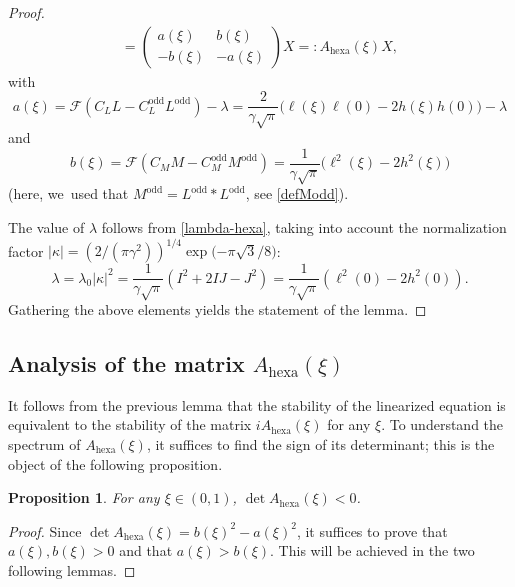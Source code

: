 \documentclass[10pt]{amsart}
\newtheorem{prop}[theorem]{Proposition}
\theoremstyle{definition}
\let\EE\exp
\newcommand{\pa}[1]{\left(#1\right)}
\begin{document}
\begin{proof}
\begin{multline}
=\begin{pmatrix} a(\xi) & b(\xi) \\[2pt] -b(\xi) & -a(\xi) \end{pmatrix}X
=:A_{\mathrm{hexa}}(\xi)X,
\end{multline}
with
\begin{equation}\label{def_a_hexa}
a(\xi) = \mathcal{F} \pa{C_L L- C_L^{\text{odd}}L^{\text{odd}}} -\lambda
= \frac{2}{\gamma\sqrt{\pi}}\bigl(\ell(\xi)\ell(0)-2h(\xi)h(0)\bigr) -\lambda
\end{equation}
and
\begin{equation}\label{def_b_hexa}
b(\xi) = \mathcal{F} \pa{C_M M- C_M^{\text{odd}}M^{\text{odd}}}
= \frac{1}{\gamma\sqrt{\pi}}\bigl({\ell^2(\xi)-2h^2(\xi)}\bigr)
\end{equation}
(here, we~used that $M^{\text{odd}} = L^{\text{odd}} * L^{\text{odd}}$, see \eqref{defModd}).

The value of $\lambda$ follows from \eqref{lambda-hexa}, taking into account the normalization factor $|\kappa|= \pa{2/{(\pi\gamma^2)}}^{1/4} \EE\bigl({-{\pi \sqrt{3}}/{8}}\bigr)$:
\begin{equation}\label{def_lambda_hexa}
\lambda = \lambda_0 |\kappa|^2=\frac{1}{\gamma\sqrt{\pi}}\pa{I^2+2IJ-J^2}=\frac{1}{\gamma\sqrt{\pi}}\pa{\ell^2(0)-2h^2(0)}.
\end{equation}
Gathering the above elements yields the statement of the lemma. \end{proof}

\subsection{Analysis of the matrix $A_{\mathrm{hexa}}(\xi)$}

It follows from the previous lemma that the stability of the linearized equation is equivalent to the stability of the matrix $iA_{\mathrm{hexa}}(\xi)$ for any $\xi$.
To understand the spectrum of $A_{\mathrm{hexa}}(\xi)$, it suffices to find the sign of its determinant; this is the object of the following proposition.

\begin{prop}\label{prop:5.4}
For any $\xi \in (0,1)$, $\det A_{\mathrm{hexa}}(\xi) < 0$.
\end{prop}

\begin{proof}
Since $\det A_{\mathrm{hexa}}(\xi) = b(\xi)^2 - a(\xi)^2$, it suffices to prove that $a(\xi),b(\xi)>0$ and that $a(\xi) > b(\xi)$. This will be achieved in the two following lemmas.\end{proof}
\end{document}

